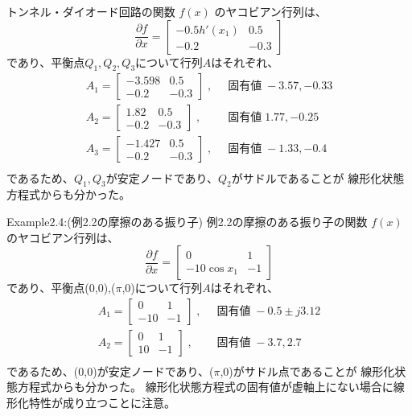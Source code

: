 \documentclass{jsarticle}
\begin{document}
トンネル・ダイオード回路の関数 $f ( x )$ のヤコビアン行列は、
\begin{equation*}
  \frac{\partial f}{\partial x} = \left[
    \begin{matrix}
      -0.5h'(x_1)& 0.5\\
      -0.2 & -0.3
    \end{matrix}
  \right]
\end{equation*}
であり、平衡点$Q_1,Q_2,Q_3$について行列$A$はそれぞれ、
\begin{align*}
  A_1 = \left[
    \begin{matrix}
      -3.598&0.5\\
      -0.2&-0.3
    \end{matrix}
  \right]\;,&\;\; \text{固有値}\;-3.57,-0.33\\
  A_2 = \left[
    \begin{matrix}
      1.82&0.5\\
      -0.2&-0.3
    \end{matrix}
  \right]\;,&\;\; \text{固有値}\;1.77,-0.25\\
  A_3 = \left[
    \begin{matrix}
      -1.427&0.5\\
      -0.2&-0.3
    \end{matrix}
  \right]\;,&\;\; \text{固有値}\;-1.33,-0.4\\
\end{align*}
であるため、$Q_1,Q_3$が安定ノードであり、$Q_2$がサドルであることが
線形化状態方程式からも分かった。

Example2.4:(例2.2の摩擦のある振り子)
例2.2の摩擦のある振り子の関数 $f ( x )$ のヤコビアン行列は、
\begin{equation*}
  \frac{\partial f}{\partial x} = \left[
    \begin{matrix}
      0& 1\\
      -10\cos x_1 & -1
    \end{matrix}
  \right]
\end{equation*}
であり、平衡点(0,0),($\pi$,0)について行列$A$はそれぞれ、
\begin{align*}
  A_1 = \left[
    \begin{matrix}
      0&1\\
      -10&-1
    \end{matrix}
  \right]\;,&\;\; \text{固有値}\;-0.5\pm j3.12\\
  A_2 = \left[
    \begin{matrix}
      0&1\\
      10&-1
    \end{matrix}
  \right]\;,&\;\; \text{固有値}\;-3.7,2.7\\
\end{align*}
であるため、(0,0)が安定ノードであり、($\pi$,0)がサドル点であることが
線形化状態方程式からも分かった。
線形化状態方程式の固有値が虚軸上にない場合に線形化特性が成り立つことに注意。
\end{document}
